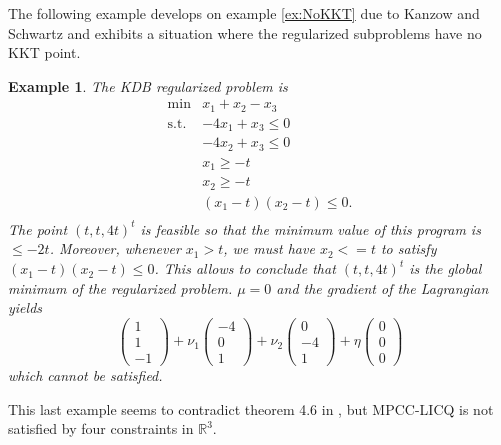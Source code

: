 \documentclass[12pt]{article}
\newtheorem{example}{Example}
\begin{document}
The following example develops on example \ref{ex:NoKKT} due to Kanzow and Schwartz and exhibits a situation where  the regularized subproblems have no KKT point.
\begin{example}\label{ex:NoKKT2}
The KDB regularized problem is
\begin{equation}\label{MPCC_Mult2}
 \begin{array}{ll} 
      \min &x_1+x_2-x_3\\
      \textrm{s.t.}&-4x_1+x_3\le0\\
          &-4x_2+x_3\le0\\
          &x_1\geq-t\\
          &x_2\geq-t\\
          &(x_1-t)(x_2-t)\le0.\\
 \end{array}
\end{equation}
The point $(t,t,4t)^t$ is feasible so that the minimum value of this program is $\leq -2t$. Moreover, whenever $x_1>t$, we must have $x_2<=t$ to satisfy $(x_1-t)(x_2-t)\le0$. This allows to conclude that $(t,t,4t)^t$ is the global minimum of the regularized problem. $\mu=0$ and the gradient of the Lagrangian yields
 \begin{equation}
\begin{pmatrix}1\\1\\-1\end{pmatrix} +
\nu_1\begin{pmatrix}-4\\0\\1\end{pmatrix} +
\nu_2\begin{pmatrix}0\\-4\\1\end{pmatrix} +
\eta\begin{pmatrix}0\\0\\0\end{pmatrix}
\end{equation}
which cannot be satisfied.
\end{example}
This last example seems to contradict theorem 4.6 in \cite{KS13}, but MPCC-LICQ is not satisfied by four constraints in $\mathbb{R}^3$.
\end{document}
